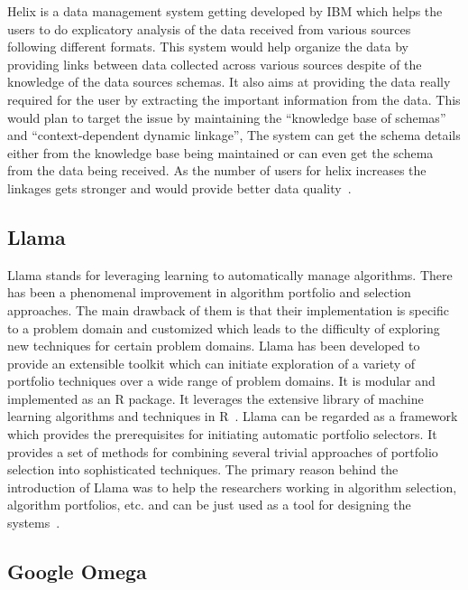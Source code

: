 Helix is a data management system getting developed by IBM which helps
the users to do explicatory analysis of the data received from various
sources following different formats. This system would help organize
the data by providing links between data collected across various
sources despite of the knowledge of the data sources schemas. It also
aims at providing the data really required for the user by extracting
the important information from the data. This would plan to target the
issue by maintaining the ``knowledge base of schemas'' and
``context-dependent dynamic linkage'', The system can get the schema
details either from the knowledge base being maintained or can even
get the schema from the data being received. As the number of users
for helix increases the linkages gets stronger and would provide
better data quality~\cite{www-ibm-helix-paper}.

     \pv
      
\subsection{Llama}

Llama stands for leveraging learning to automatically manage
algorithms. There has been a phenomenal improvement in algorithm
portfolio and selection approaches. The main drawback of them is that
their implementation is specific to a problem domain and customized
which leads to the difficulty of exploring new techniques for certain
problem domains. Llama has been developed to provide an extensible
toolkit which can initiate exploration of a variety of portfolio
techniques over a wide range of problem domains. It is modular and
implemented as an R package. It leverages the extensive library of
machine learning algorithms and techniques in R~\cite{lla1}. Llama can
be regarded as a framework which provides the prerequisites for
initiating automatic portfolio selectors. It provides a set of methods
for combining several trivial approaches of portfolio selection into
sophisticated techniques. The primary reason behind the introduction
of Llama was to help the researchers working in algorithm selection,
algorithm portfolios, etc. and can be just used as a tool for
designing the systems~\cite{lla1}.
     
\subsection{Google Omega}

\pv 

